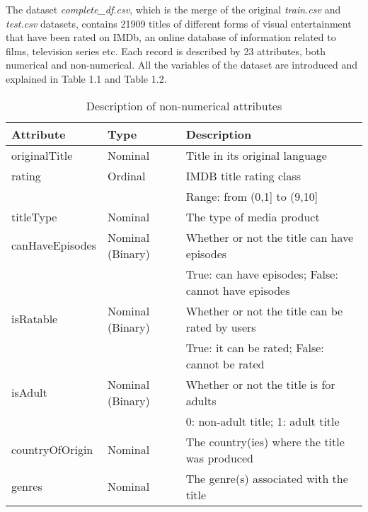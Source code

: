 % 


The dataset \textit{complete\_df.csv}, which is the merge of the original \textit{train.csv} and \textit{test.csv} datasets, contains 21909 titles of different forms of visual entertainment that have been rated on IMDb, an online database of information related to films, television series etc. 
Each record is described by 23 attributes, both numerical and non-numerical. 
All the variables of the dataset are introduced and explained in Table 1.1 and Table 1.2.
\begin{table}[h!]
    \centering
    \begin{tabularx}{\textwidth}{|l|l|X|} %
        \hline
        \textbf{Attribute} & \textbf{Type} & \textbf{Description} \\ 
        \hline
        originalTitle & Nominal & Title in its original language \\  
        \hline
        rating & Ordinal & IMDB title rating class \\
        & & Range: from (0,1] to (9,10] \\ 
        \hline
        titleType & Nominal & The type of media product \\ 
        \hline
        canHaveEpisodes & Nominal (Binary) & Whether or not the title can have episodes \\ 
        & & True: can have episodes; False: cannot have episodes \\ 
        \hline
        isRatable & Nominal (Binary) & Whether or not the title can be rated by users \\ 
        & & True: it can be rated; False: cannot be rated \\ 
        \hline
        isAdult & Nominal (Binary) & Whether or not the title is for adults \\ 
        & & 0: non-adult title; 1: adult title \\ 
        \hline
        countryOfOrigin & Nominal & The country(ies) where the title was produced \\ 
        \hline
        genres & Nominal & The genre(s) associated with the title \\ 
        \hline
    \end{tabularx}
    \caption{Description of non-numerical attributes}
    \label{tab:attributes}
\end{table}

